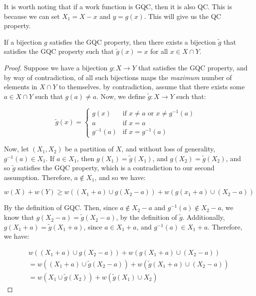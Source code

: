 It is worth noting that if a work function is GQC, then it is also QC. This is because we can set $X_1 = X-x$ and $y = g(x)$. This will give us the QC property.

\begin{lemma}
    If a bijection $g$ satisfies the GQC property, then there exists a bijection $\tilde{g}$ that satisfies the GQC property such that $\tilde{g}(x) = x$ for all $x \in X \cap Y$.
\end{lemma}
\begin{proof}
    Suppose we have a bijection $g: X \rightarrow Y$ that satisfies the GQC property, and by way of contradiction, of all such bijections maps the \textit{maximum} number of elements in $X \cap Y$ to themselves. by contradiction, assume that there exists some $a \in X \cap Y$ such that $g(a) \neq a$. Now, we define $\tilde{g}: X \rightarrow Y$ such that:
    
    \begin{equation*}
        \tilde{g}(x) = \begin{cases}
            g(x) & \text{if } x \neq a \text{ or } x \neq g^{-1}(a) \\
            a & \text{if } x = a \\
            g^{-1}(a) & \text{if } x = g^{-1}(a)
        \end{cases}
    \end{equation*}
    
    Now, let $(X_1, X_2)$ be a partition of $X$, and without loss of generality, $g^{-1}(a) \in X_1$. If $a \in X_1$, then $g(X_1) = \tilde{g}(X_1)$, and $g(X_2) = \tilde{g}(X_2)$, and so $\tilde{g}$ satisfies the GQC property, which is a contradiction to our second assumption. Therefore, $a \not\in X_1$, and so we have:

    \begin{equation*}
        w(X) + w(Y) \geq w((X_1+a) \cup g(X_2-a)) + w(g(x_1+a) \cup (X_2-a))
    \end{equation*}

    By the definition of GQC. Then, since $a\not \in X_2-a$ and $g^{-1}(a) \not \in X_2-a$, we know that $g(X_2-a) = \tilde{g}(X_2-a)$, by the definition of $\tilde{g}$. Additionally, $g(X_1+a) = \tilde{g}(X_1+a)$, since $a \in X_1 + a$, and $g^{-1}(a) \in X_1+a$. Therefore, we have: 
    
    \begin{equation*}
        \begin{split}
            & w((X_1+a) \cup g(X_2-a)) + w(g(X_1+a) \cup (X_2-a)) \\
            & = w((X_1+a) \cup \tilde{g}(X_2-a)) + w(\tilde{g}(X_1+a) \cup (X_2-a)) \\ 
            & = w(X_1 \cup \tilde{g}(X_2)) + w(\tilde{g}(X_1) \cup X_2)
        \end{split}
    \end{equation*}


\end{proof}
